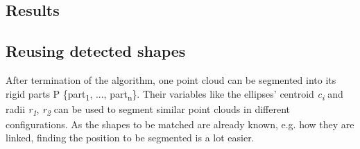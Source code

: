 \subsection{Results}

\subsection{Reusing detected shapes}

After termination of the algorithm, one point cloud can be segmented into its rigid parts P \{part\textsubscript{1}, ..., part\textsubscript{n}\}. Their variables like the ellipses' centroid \textit{c\textsubscript{i}} and radii \textit{r\textsubscript{1}}, \textit{r\textsubscript{2}} can be used to segment similar point clouds in different configurations. As the shapes to be matched are already known, e.g. how they are linked, finding the position to be segmented is a lot easier.